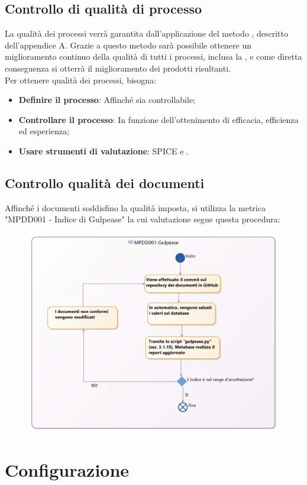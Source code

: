\documentclass[NormeDiProgetto.tex]{subfiles}
\begin{document}
	\subsection{Controllo di qualità di processo}
	La qualità dei processi verrà garantita dall'applicazione del metodo , descritto dell'appendice A. Grazie a questo metodo sarà possibile ottenere un miglioramento continuo della qualità di tutti i processi, inclusa la , e come diretta conseguenza si otterrà il miglioramento dei prodotti risultanti.\\Per ottenere qualità dei processi, bisogna:
	\begin{itemize}
		\item \textbf{Definire il processo}: Affinché sia controllabile;
		\item \textbf{Controllare il processo}: In funzione dell'ottenimento di efficacia, efficienza ed esperienza;
		\item \textbf{Usare strumenti di valutazione}: SPICE e .
	\end{itemize}

	\subsection{Controllo qualità dei documenti}
	Affinché i documenti soddisfino la qualità imposta, si utilizza la metrica "MPDD001 - Indice di Gulpease" la cui valutazione segue questa procedura:
	\begin{figure}[H]
	\centering
	\includegraphics[width=0.7\linewidth]{../../common/images/MetricaGulpease}
	\end{figure}

	\section{Configurazione}
	
\end{document}
